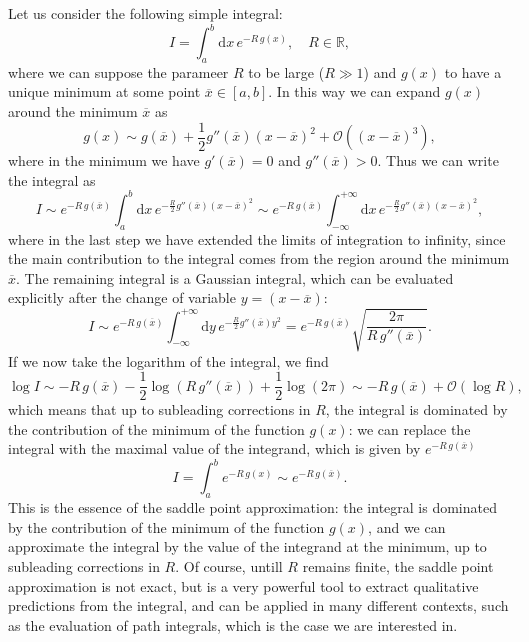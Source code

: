 \begin{example}
    Let us consider the following simple integral:
    \[
        I = \int_a^b \mathrm{d}x\, e^{-R\,g(x)}, \quad R \in \mathbb{R},
    \]
    where we can suppose the parameer \(R\) to be large (\(R \gg 1\)) and \(g(x)\) to have a unique minimum at some point \(\overline{x} \in [a,b]\). In this way we can expand \(g(x)\) around the minimum \(\overline{x}\) as
    \[
        g(x) \sim g(\overline{x}) + \frac{1}{2} g''(\overline{x}) (x - \overline{x})^2 + \mathcal{O}((x - \overline{x})^3),
    \]
    where in the minimum we have \(g'(\overline{x}) = 0\) and \(g''(\overline{x}) > 0\). Thus we can write the integral as
    \[
        I \sim e^{-R\,g(\overline{x})} \int_a^b \mathrm{d}x\, e^{-\tfrac{R}{2} g''(\overline{x}) (x - \overline{x})^2} \sim e^{-R\,g(\overline{x})} \int_{-\infty}^{+\infty} \mathrm{d}x\, e^{-\tfrac{R}{2} g''(\overline{x}) (x - \overline{x})^2},
    \]
    where in the last step we have extended the limits of integration to infinity, since the main contribution to the integral comes from the region around the minimum \(\overline{x}\). The remaining integral is a Gaussian integral, which can be evaluated explicitly after the change of variable \(y = (x - \overline{x})\):
    \[
        I \sim e^{-R\,g(\overline{x})} \int_{-\infty}^{+\infty} \mathrm{d}y\, e^{-\tfrac{R}{2} g''(\overline{x}) y^2} = e^{-R\,g(\overline{x})} \sqrt{\frac{2\pi}{R\,g''(\overline{x})}}.
    \]
    If we now take the logarithm of the integral, we find
    \[
        \log I \sim -R\,g(\overline{x}) - \frac{1}{2} \log(R\,g''(\overline{x})) + \frac{1}{2} \log(2\pi) \sim -R\,g(\overline{x}) + \mathcal{O}(\log R),
    \]
    which means that up to subleading corrections in \(R\), the integral is dominated by the contribution of the minimum of the function \(g(x)\): we can replace the integral with the maximal value of the integrand, which is given by \(e^{-R\,g(\overline{x})}\)
    \[
        I = \int_a^b e^{-R\,g(x)} \sim e^{-R\,g(\overline{x})}.
    \]
    This is the essence of the saddle point approximation: the integral is dominated by the contribution of the minimum of the function \(g(x)\), and we can approximate the integral by the value of the integrand at the minimum, up to subleading corrections in \(R\). Of course, untill \(R\) remains finite, the saddle point approximation is not exact, but is a very powerful tool to extract qualitative predictions from the integral, and can be applied in many different contexts, such as the evaluation of path integrals, which is the case we are interested in.
\end{example}

